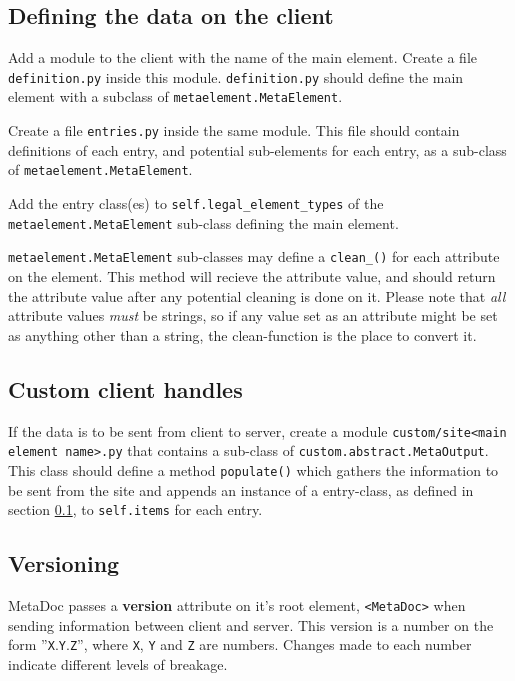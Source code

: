 \subsection{Defining the data on the client}
\label{sec:defclientmodel}
Add a module to the client with the name of the main element. Create a file
\texttt{definition.py} inside this module. \texttt{definition.py} should define
the main element with a subclass of \texttt{metaelement.MetaElement}.

Create a file \texttt{entries.py} inside the same module. This file should
contain definitions of each entry, and potential sub-elements for each entry,
as a sub-class of \texttt{metaelement.MetaElement}. 

Add the entry class(es) to \texttt{self.legal\_element\_types} of the \\ 
\texttt{metaelement.MetaElement} sub-class defining the main element. 

\texttt{metaelement.MetaElement} sub-classes may define a
\texttt{clean\_<attribute name>()} for each attribute on the element. This method
will recieve the attribute value, and should return the attribute value after
any potential cleaning is done on it. Please note that \textit{all} attribute
values \textit{must} be strings, so if any value set as an attribute might be
set as anything other than a string, the clean-function is the place to convert
it.

\subsection{Custom client handles}
If the data is to be sent from client to server, create a module
\texttt{custom/site<main element name>.py} that contains a sub-class of
\texttt{custom.abstract.MetaOutput}. This class should define a method
\texttt{populate()} which gathers the information to be sent from the site and
appends an instance of a entry-class, as defined in section
\ref{sec:defclientmodel}, to \texttt{self.items} for each entry.

\subsection{Versioning}
MetaDoc passes a \textbf{version} attribute on it's root element,
\texttt{<MetaDoc>} when sending information between client and server. This
version is a number on the form ''\texttt{X}.\texttt{Y}.\texttt{Z}'', where
\texttt{X}, \texttt{Y} and \texttt{Z} are numbers. Changes made to each number 
indicate different levels of breakage. 

